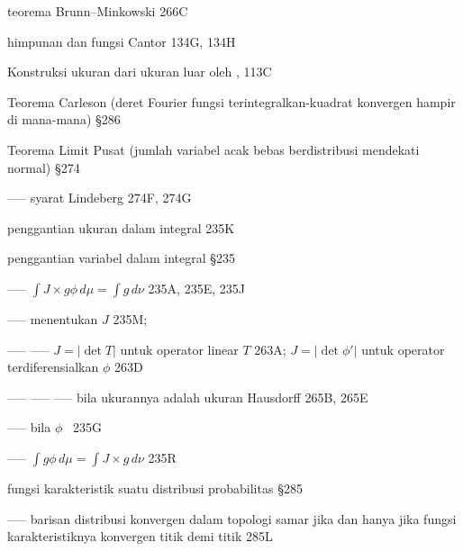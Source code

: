 teorema Brunn--Minkowski 266C

\indexmedskip

 himpunan dan fungsi Cantor 134G, 134H




\indexheader{\Caratheodory} Konstruksi ukuran dari ukuran luar oleh \Caratheodory, 113C

















 Teorema Carleson (deret Fourier fungsi terintegralkan-kuadrat konvergen hampir di mana-mana) \S286








 Teorema Limit Pusat (jumlah variabel acak bebas berdistribusi mendekati normal) \S274


----- syarat Lindeberg 274F, 274G

 penggantian ukuran dalam integral 235K

penggantian variabel dalam integral \S235

----- $\int J\times g\phi\,d\mu=\int g\,d\nu$ 235A, 235E, 235J

----- menentukan $J$ 235M; 

----- ----- $J=|\det T|$ untuk operator linear $T$ 263A; $J=|\det\phi'|$ untuk operator terdiferensialkan $\phi$ 263D


----- ----- ----- bila ukurannya adalah ukuran Hausdorff 265B, 265E


----- bila $\phi$ \imp\ 235G

----- $\int g\phi\,d\mu=\int J\times g\,d\nu$ 235R

 fungsi karakteristik suatu distribusi probabilitas \S285

----- barisan distribusi konvergen dalam topologi samar jika dan hanya jika fungsi karakteristiknya konvergen titik demi titik 285L















































